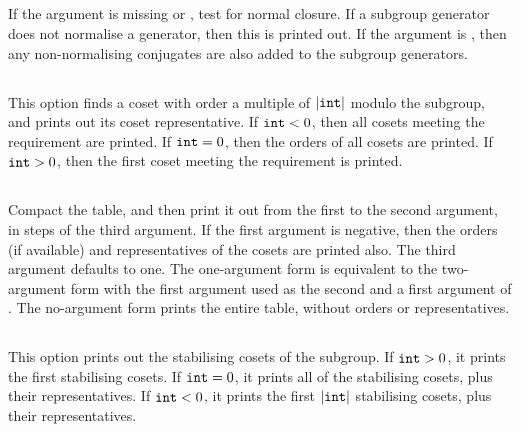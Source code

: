 \subsection{}
\label{cmd:nc}
\label{cmd:normal closure}

If the argument is missing or , test for normal closure.
If a subgroup generator does not normalise a generator, then this is
  printed out.
If the argument is , then any non-normalising conjugates are
  also added to the subgroup generators.

\subsection{}
\label{cmd:oo}
\label{cmd:order option}

This option finds a coset with order a multiple of $|\texttt{int}|$ modulo
  the subgroup, and prints out its coset representative.
If $\texttt{int} < 0$, then all cosets meeting the requirement are printed.
If $\texttt{int} = 0$, then the orders of all cosets are printed.
If $\texttt{int} > 0$, then the first coset meeting the requirement is
  printed.

\subsection{}
\label{cmd:print table}

Compact the table, and then print it out from the first to the second
  argument, in steps of the third argument.
If the first argument is negative, then the orders (if available) and
  representatives of the cosets are printed also.
The third argument defaults to one.
The one-argument form is equivalent to the two-argument form with the
  first argument used as the second and a first argument of .
The no-argument form prints the entire table, without orders or
  representatives.

\subsection{}
\label{cmd:sc}
\label{cmd:stabilizing coset}

This option prints out the stabilising cosets of the subgroup.
If $\texttt{int} > 0$, it prints the first  stabilising cosets.
If $\texttt{int} = 0$, it prints all of the stabilising cosets, plus their
  representatives.
If $\texttt{int} < 0$, it prints the first $|\texttt{int}|$ stabilising cosets,
  plus their representatives.

